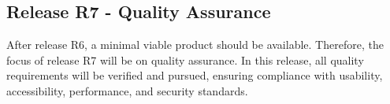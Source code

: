 \subsection{Release R7 - Quality Assurance}
After release R6, a minimal viable product should be available. Therefore, the focus of release R7 will be on quality assurance. In this release, all quality requirements will be verified and pursued, ensuring compliance with usability, accessibility, performance, and security standards.
